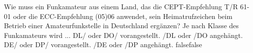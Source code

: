     {Wie muss ein Funkamateur aus einem Land, das die CEPT-Empfehlung T/R 61-01 oder die ECC-Empfehlung (05)06 anwendet, sein Heimatrufzeichen beim Betrieb einer Amateurfunkstelle in Deutschland ergänzen? Je nach Klasse des Funkamateurs wird ...}
    {DL/ oder DO/ vorangestellt.}
    {/DL oder /DO angehängt.}
    {DE/ oder DP/ vorangestellt.}
    {/DE oder /DP angehängt.}
    {false}{false}